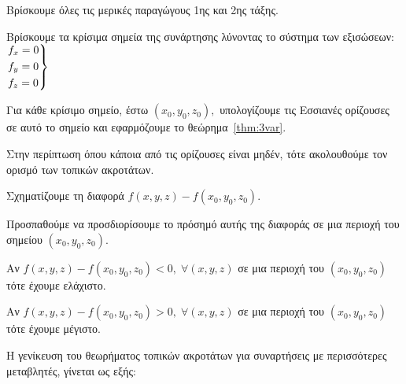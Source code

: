 \begin{enumerate}
  \item Βρίσκουμε όλες τις μερικές παραγώγους 1ης και 2ης τάξης.
  \item Βρίσκουμε τα κρίσιμα σημεία της συνάρτησης λύνοντας το σύστημα των εξισώσεων: 
    $ \begin{rcases}
      f_{x} = 0 \\
      f_{y} = 0 \\
      f_{z} = 0
    \end{rcases} $
  \item Για κάθε κρίσιμο σημείο, έστω $ (x_{0}, y_{0}, z_{0}), $ υπολογίζουμε 
    τις Εσσιανές ορίζουσες σε αυτό το σημείο και εφαρμόζουμε το 
    θεώρημα~\ref{thm:3var}.
  \item Στην περίπτωση όπου κάποια από τις ορίζουσες είναι μηδέν, τότε 
    ακολουθούμε τον ορισμό των τοπικών ακροτάτων.
    \begin{myitemize}
      \item Σχηματίζουμε τη διαφορά $ f(x,y,z) - f(x_{0}, y_{0}, z_{0}) $.
      \item Προσπαθούμε να προσδιορίσουμε το πρόσημό αυτής της διαφοράς σε 
        μια περιοχή του σημείου $ (x_{0}, y_{0}, z_{0}) $.
        \begin{myitemize}
          \item Αν $ f(x,y,z) - f(x_{0}, y_{0}, z_{0}) < 0, \; 
            \forall (x,y,z) $ σε μια
            περιοχή του $ (x_{0}, y_{0}, z_{0}) $ τότε έχουμε ελάχιστο. 
          \item Αν $ f(x,y,z) - f(x_{0}, y_{0}, z_{0}) > 0, \; 
            \forall (x,y,z) $ σε μια
            περιοχή του $ (x_{0}, y_{0}, z_{0}) $ τότε έχουμε μέγιστο. 
        \end{myitemize}
    \end{myitemize}
\end{enumerate}

Η γενίκευση του θεωρήματος τοπικών ακροτάτων για συναρτήσεις με περισσότερες 
μεταβλητές, γίνεται ως εξής: 

